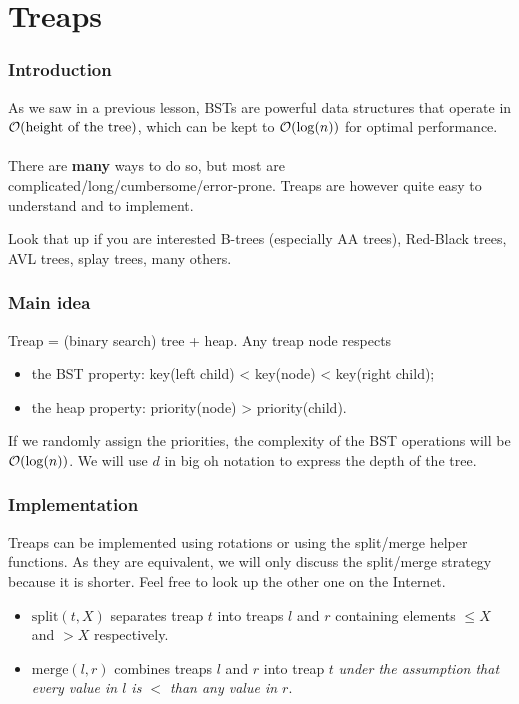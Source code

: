 \section{Treaps}

\begin{frame}
	\frametitle{Introduction}
	As we saw in a previous lesson, BSTs are powerful data structures that operate in $\mathcal O(\text{height of the tree})$, which can be kept to $\mathcal O(\log(n))$ for optimal performance. \\~\\
	
	There are \textbf{many} ways to do so, but most are complicated/long/cumbersome/error-prone.
	Treaps are however quite easy to understand and to implement.
	
	\begin{block}{Look that up if you are interested}
		B-trees (especially AA trees), Red-Black trees, AVL trees, splay trees, many others.
	\end{block}
	
\end{frame}

\begin{frame}
	\frametitle{Main idea}
	Treap = (binary search) tree + heap. Any treap node respects
	\begin{itemize}
		\item the BST property: key(left child) < key(node) < key(right child);
		\item the heap property: priority(node) > priority(child).
	\end{itemize}
	If we randomly assign the priorities, the complexity of the BST operations will be $\mathcal O(\log(n))$. We will use $d$ in big oh notation to express the depth of the tree.
\end{frame}

\begin{frame}
	\frametitle{Implementation}
	Treaps can be implemented using rotations or using the split/merge helper functions.
	As they are equivalent, we will only discuss the split/merge strategy because it is shorter. Feel free to look up the other one on the Internet.
	\begin{itemize}
		\item $\mathrm{split} (t, X)$ separates treap $t$ into treaps $l$ and $r$ containing elements $\le X$ and $> X$ respectively.
		\item $\mathrm{merge} (l, r)$ combines treaps $l$ and $r$ into treap $t$ \textit{under the assumption that every value in $l$ is $<$ than any value in $r$}.
	\end{itemize}
\end{frame}

